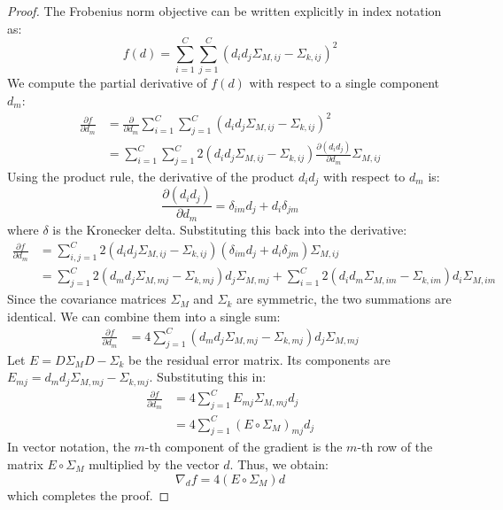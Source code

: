 \documentclass{article}
\theoremstyle{plain}
\theoremstyle{definition}
\theoremstyle{remark}
\begin{document}
\begin{proof}
The Frobenius norm objective can be written explicitly in index notation as:
\begin{equation*}
  f(d) = \sum_{i=1}^C \sum_{j=1}^C \left( d_i d_j \Sigma_{M,ij} - \Sigma_{k,ij} \right)^2
\end{equation*}
We compute the partial derivative of $f(d)$ with respect to a single component $d_m$:
\begin{align*}
  \frac{\partial f}{\partial d_m} &= \frac{\partial}{\partial d_m} \sum_{i=1}^C \sum_{j=1}^C \left( d_i d_j \Sigma_{M,ij} - \Sigma_{k,ij} \right)^2 \\
  &= \sum_{i=1}^C \sum_{j=1}^C 2 \left( d_i d_j \Sigma_{M,ij} - \Sigma_{k,ij} \right) \frac{\partial (d_i d_j)}{\partial d_m} \Sigma_{M,ij}
\end{align*}
Using the product rule, the derivative of the product $d_i d_j$ with respect to $d_m$ is:
\begin{equation*}
  \frac{\partial (d_i d_j)}{\partial d_m} = \delta_{im} d_j + d_i \delta_{jm}
\end{equation*}
where $\delta$ is the Kronecker delta. Substituting this back into the derivative:
\begin{align*}
  \frac{\partial f}{\partial d_m} &= \sum_{i,j=1}^C 2 \left( d_i d_j \Sigma_{M,ij} - \Sigma_{k,ij} \right) \left( \delta_{im} d_j + d_i \delta_{jm} \right) \Sigma_{M,ij} \\
  &= \sum_{j=1}^C 2 \left( d_m d_j \Sigma_{M,mj} - \Sigma_{k,mj} \right) d_j \Sigma_{M,mj} + \sum_{i=1}^C 2 \left( d_i d_m \Sigma_{M,im} - \Sigma_{k,im} \right) d_i \Sigma_{M,im}
\end{align*}
Since the covariance matrices $\Sigma_M$ and $\Sigma_k$ are symmetric, the two summations are identical. We can combine them into a single sum:
\begin{align*}
  \frac{\partial f}{\partial d_m} &= 4 \sum_{j=1}^C \left( d_m d_j \Sigma_{M,mj} - \Sigma_{k,mj} \right) d_j \Sigma_{M,mj}
\end{align*}
Let $E = D \Sigma_M D - \Sigma_k$ be the residual error matrix. Its components are $E_{mj} = d_m d_j \Sigma_{M,mj} - \Sigma_{k,mj}$. Substituting this in:
\begin{align*}
  \frac{\partial f}{\partial d_m} &= 4 \sum_{j=1}^C E_{mj} \Sigma_{M,mj} d_j \\
  &= 4 \sum_{j=1}^C (E \circ \Sigma_M)_{mj} d_j
\end{align*}
In vector notation, the $m$-th component of the gradient is the $m$-th row of the matrix $E \circ \Sigma_M$ multiplied by the vector $d$. Thus, we obtain:
\begin{equation}
  \nabla_d f = 4 (E \circ \Sigma_M) d
\end{equation}
which completes the proof.
\end{proof}
\end{document}
